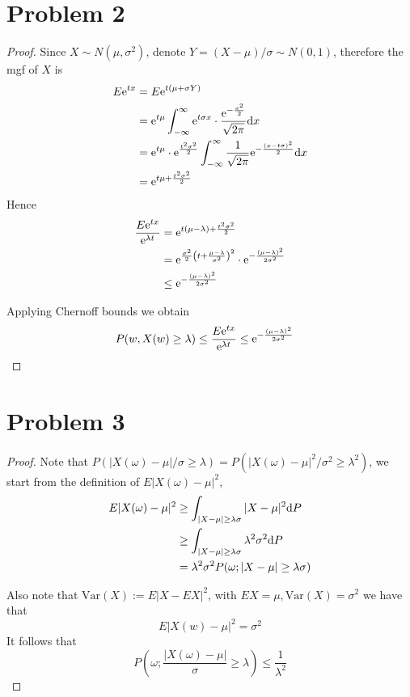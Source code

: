 \documentclass{homework}
\begin{document}
    \section{Problem 2}
    \begin{proof}
        Since $X\sim N(\mu,\sigma^2)$,
        denote $Y=(X-\mu)/\sigma\sim N(0,1)$, therefore
        the mgf of $X$ is
        \begin{align*}
            E\mathrm e^{tx}&=E\mathrm e^{t(\mu+\sigma Y)}\\
                    &=\mathrm e^{t\mu}\int_{-\infty}^\infty\mathrm e^{t\sigma x}
                      \cdot\frac{\mathrm e^{-\frac{x^2}2}}{\sqrt{2\pi}}\mathrm d x\\
                    &=\mathrm e^{t\mu}\cdot\mathrm e^{\frac{t^2\sigma^2}{2}}\int_{-\infty}^{\infty}
                      \frac{1}{\sqrt{2\pi}}\mathrm e^{-\frac{(x-t\sigma)^2}{2}}
                      \mathrm d x\\
                    &=\mathrm e^{t\mu+\frac{t^2\sigma^2}{2}}
        \end{align*}
        Hence
        \begin{align*}
            \frac{E\mathrm e^{tx}}{\mathrm e^{\lambda t}}&=\mathrm e^{t(\mu-\lambda)+\frac{t^2\sigma^2}{2}}\\
            &=\mathrm e^{\frac{\sigma^2}{2}\left(t+\frac{\mu-\lambda}{\sigma^2}\right)^2}
              \cdot\mathrm e^{-\frac{(\mu-\lambda)^2}{2\sigma^2}}\\
            &\leq\mathrm e^{-\frac{(\mu-\lambda)^2}{2\sigma^2}}
        \end{align*}

        Applying Chernoff bounds we obtain
        \begin{align*}
            P(w,X(w)\geq\lambda)&\leq\frac{E\mathrm e^{tx}}{\mathrm e^{\lambda t}}
            \leq\mathrm e^{-\frac{(\mu-\lambda)^2}{2\sigma^2}}
        \end{align*}
    \end{proof}

    \section{Problem 3}
    \begin{proof}
        Note that $P(|X(\omega)-\mu|/\sigma\geq\lambda)
        =P(|X(\omega)-\mu|^2/\sigma^2\geq\lambda^2)$,
        we start from the definition of $E|X(\omega)-\mu|^2$,
        \begin{align*}
            E|X(\omega)-\mu|^2
            &\geq\int_{|X-\mu|\geq\lambda\sigma}|X-\mu|^2\mathrm d P\\
            &\geq\int_{|X-\mu|\geq\lambda\sigma}\lambda^2\sigma^2\mathrm d P\\
            &=\lambda^2\sigma^2 P(\omega;|X-\mu|\geq \lambda\sigma)
        \end{align*}

        Also note that $\mathrm{Var}(X):=E|X-EX|^2$,
        with $EX=\mu,\mathrm{Var}(X)=\sigma^2$ we have that
        \[E|X(w)-\mu|^2=\sigma^2\]
        It follows that
        \[P\left(\omega;\frac{|X(\omega)-\mu|}{\sigma}\geq\lambda\right)
        \leq\frac{1}{\lambda^2}\]
    \end{proof}
\end{document}
